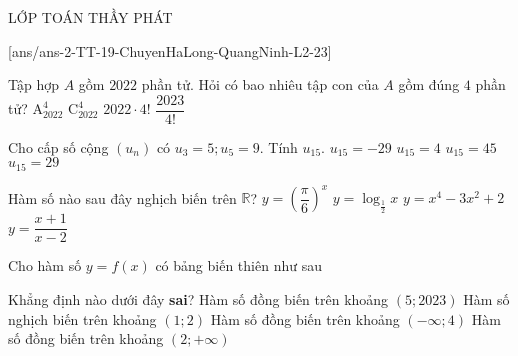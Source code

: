 \begin{name}
	{\tenchude}{\tendethi}{LỚP TOÁN THẦY PHÁT}{\thoigian}
\end{name}
\setcounter{ex}{0}\setcounter{bt}{0}
[ans/ans-2-TT-19-ChuyenHaLong-QuangNinh-L2-23]
\begin{ex}%
	Tập hợp $A$ gồm $2022$ phần tử. Hỏi có bao nhiêu tập con của $A$ gồm đúng $4$ phần tử?
	\choice
	{$\mathrm{A}_{2022}^4$}
	{\True $\mathrm{C}_{2022}^4$}
	{$2022\cdot4!$}
	{$\dfrac{2023}{4!}$}
\end{ex}

\begin{ex}%
	Cho cấp số cộng $(u_n)$ có $u_3=5;u_5=9$. Tính $u_{15}$. 
	\choice
	{$u_{15}=-29$}
	{$u_{15}=4$}
	{$u_{15}=45$}
	{\True $u_{15}=29$}
\end{ex}

\begin{ex}%
	Hàm số nào sau đây nghịch biến trên $\mathbb{R}$?
	\choice
	{\True $y=\left(\dfrac{\pi}{6}\right)^x$}
	{$y=\log_{\tfrac{1}{2}}x$}
	{$y=x^4-3x^2+2$}
	{$y=\dfrac{x+1}{x-2}$}
\end{ex}

\begin{ex}%
	Cho hàm số $y=f(x)$ có bảng biến thiên như sau
	\begin{center}
	\end{center}
	Khẳng định nào dưới đây \textbf{sai}?
	\choice
	{Hàm số đồng biến trên khoảng $(5;2023)$}
	{Hàm số nghịch biến trên khoảng $(1;2)$}
	{\True Hàm số đồng biến trên khoảng $(-\infty;4)$}
	{Hàm số đồng biến trên khoảng $(2;+\infty)$}
\end{ex}

